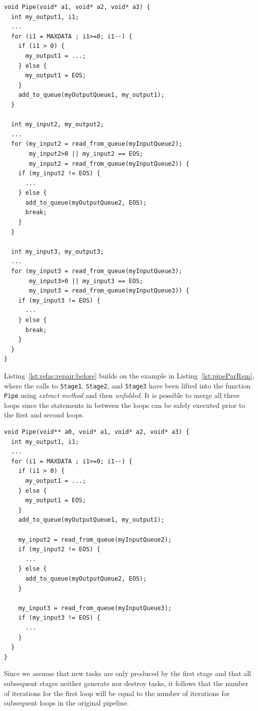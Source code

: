 %
\begin{lstlisting}[caption=Intermediate Code Repair Stage for Simple Pipeline Example, label=lst:refac:repair:before]
void Pipe(void* a1, void* a2, void* a3) {
  int my_output1, i1;
  ...
  for (i1 = MAXDATA ; i1>=0; i1--) {
    if (i1 > 0) {
      my_output1 = ...;
    } else {
      my_output1 = EOS;
    }
    add_to_queue(myOutputQueue1, my_output1);
  }

  int my_input2, my_output2;
  ...
  for (my_input2 = read_from_queue(myInputQueue2);
       my_input2>0 || my_input2 == EOS;
       my_input2 = read_from_queue(myInputQueue2)) {
    if (my_input2 != EOS) {
      ...
    } else {
      add_to_queue(myOutputQueue2, EOS);
      break;
    }
  }

  int my_input3, my_output3;
  ...
  for (my_input3 = read_from_queue(myInputQueue3);
       my_input3>0 || my_input3 == EOS;
       my_input3 = read_from_queue(myInputQueue3)) {
    if (my_input3 != EOS) {
      ...
    } else {
      break;
    }
  }
}
\end{lstlisting}
%
\noindent
Listing~\ref{lst:refac:repair:before} builds on the example in Listing~\ref{lst:pipeParRem}, where the calls to \lstinline|Stage1|, \lstinline|Stage2|, and \lstinline|Stage3| have been lifted into the function \lstinline|Pipe| using \emph{extract method} and then \emph{unfolded}.
%
It is possible to merge all three loops since the statements in between the loops can be safely executed prior to the first and second loops.
%
\begin{lstlisting}[caption=Following Merging of loops in Listing~\ref{lst:refac:repair:before}, label=lst:refac:repair:after]
void Pipe(void** a0, void* a1, void* a2, void* a3) {
  int my_output1, i1;
  ...
  for (i1 = MAXDATA ; i1>=0; i1--) {
    if (i1 > 0) {
      my_output1 = ...;
    } else {
      my_output1 = EOS;
    }
    add_to_queue(myOutputQueue1, my_output1);

    my_input2 = read_from_queue(myInputQueue2);
    if (my_input2 != EOS) {
      ...
    } else {
      add_to_queue(myOutputQueue2, EOS);
    }

    my_input3 = read_from_queue(myInputQueue3);
    if (my_input3 != EOS) {
      ...
    }
  }
}

\end{lstlisting}
%
Since we assume that new tasks are only produced by the first stage and that all subsequent stages neither generate nor destroy tasks, it follows that the number of iterations for the first loop will be equal to the number of iterations for subsequent loops in the original pipeline.
